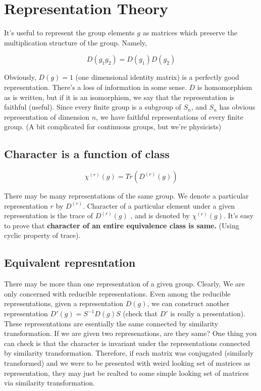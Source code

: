 \documentclass{report}
\begin{document}
\section{Representation Theory}

It's useful to represent the group elements $g$ as matrices which preserve the multiplication structure of the group. Namely,

$$D(g_1 g_2) = D(g_1)D(g_2)$$

\noindent Obviously, $D(g) = 1$ (one dimensional identity matrix) is a perfectly good representation. There's a loss of information in some sense. $D$ is homomorphism as is written, but if it is an isomorphism, we say that the representation is faithful (useful). Since every finite group is a subgroup of $S_n$, and $S_n$ has obvious representation of dimension $n$, we have faithful representations of every finite group. (A bit complicated for continuous groups, but we're physicists)

\subsection{Character is a function of class}

$$\chi^{(r)}(g) = Tr(D^{(r)}(g))$$

\noindent There may be many representations of the same group. We denote a particular representation $r$ by $D^{(r)}$. Character of a particular element under a given representation is the trace of $D^{(r)}(g)$ , and is denoted by $\chi^{(r)}(g)$. It's easy to prove that \textbf{character of an entire equivalence class is same.} (Using cyclic property of trace).

\subsection{Equivalent represntation} 

There may be more than one representation of a given group. Clearly, We are only concerned with reducible representations. Even among the reducible representations, given a representation $D(g)$, we can construct another representation $D'(g) = S^{-1} D(g) S$ (check that $D'$ is really a presentation). These representations are esentially the same connected by similarity transformation. If we are given two represenations, are they same? One thing you can check is that the character is invariant under the representations connected by similarity transformation. Therefore, if each matrix was conjugated (similarly transformed) and we were to be presented with weird looking set of matrices as representation, they may just be realted to some simple looking set of matrices via similarity transformation.
\end{document}
